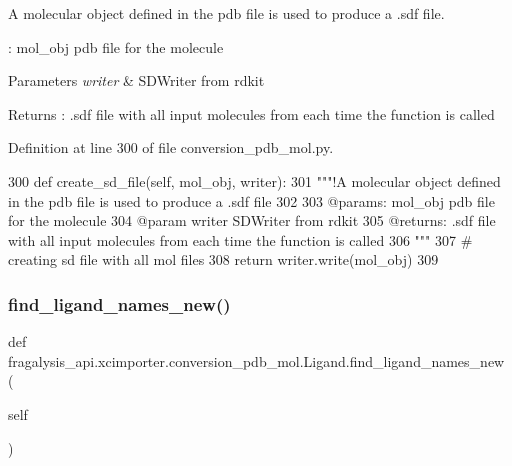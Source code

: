 A molecular object defined in the pdb file is used to produce a .sdf file. 

\+: mol\+\_\+obj pdb file for the molecule 
\begin{DoxyParams}{Parameters}
{\em writer} & S\+D\+Writer from rdkit \\
\hline
\end{DoxyParams}
\begin{DoxyReturn}{Returns}
\+: .sdf file with all input molecules from each time the function is called 
\end{DoxyReturn}


Definition at line 300 of file conversion\+\_\+pdb\+\_\+mol.\+py.


\begin{DoxyCode}
300     \textcolor{keyword}{def }create\_sd\_file(self, mol\_obj, writer):
301         \textcolor{stringliteral}{"""!A molecular object defined in the pdb file is used to produce a .sdf file}
302 \textcolor{stringliteral}{}
303 \textcolor{stringliteral}{        @params: mol\_obj pdb file for the molecule}
304 \textcolor{stringliteral}{        @param writer SDWriter from rdkit}
305 \textcolor{stringliteral}{        @returns: .sdf file with all input molecules from each time the function is called}
306 \textcolor{stringliteral}{        """}
307         \textcolor{comment}{# creating sd file with all mol files}
308         \textcolor{keywordflow}{return} writer.write(mol\_obj)
309 
\end{DoxyCode}
\mbox{\label{classfragalysis__api_1_1xcimporter_1_1conversion__pdb__mol_1_1_ligand_aa9601289368daa83655aa849041e7b63}} 
\subsubsection{\texorpdfstring{find\+\_\+ligand\+\_\+names\+\_\+new()}{find\_ligand\_names\_new()}}
{\footnotesize\ttfamily def fragalysis\+\_\+api.\+xcimporter.\+conversion\+\_\+pdb\+\_\+mol.\+Ligand.\+find\+\_\+ligand\+\_\+names\+\_\+new (\begin{DoxyParamCaption}\item[{}]{self }\end{DoxyParamCaption})}



